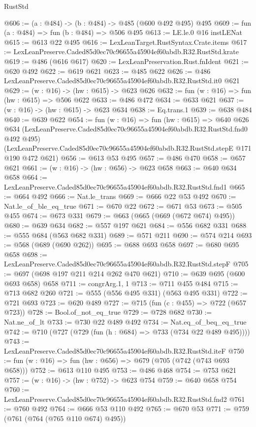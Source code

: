 \begin{lexlean}{RustStd}
\begin{coremodule}
@606 := (a : @484) -> (b : @484) -> @485 (@600 @492 @495) @495
@609 := fun (a : @484) => fun (b : @484) => @506 @495
@613 := LE.le.{0} @16 instLENat
@615 := @613 @22 @495
@616 := LexLeanTarget.RustSyntax.Crate.items
@617 := LexLeanPreserve.Caded85d0ec70c96655a45904ef60abdb.R32.RustStd.krate
@619 := @486 (@616 @617)
@620 := LexLeanPreservation.Rust.fnIdent
@621 := @620 @492
@622 := @619 @621
@623 := @485 @622
@626 := @486 LexLeanPreserve.Caded85d0ec70c96655a45904ef60abdb.R32.RustStd.it0 @621
@629 := (w : @16) -> (hw : @615) -> @623 @626
@632 := fun (w : @16) => fun (hw : @615) => @506 @622
@633 := @486 @472
@634 := @633 @621
@637 := (w : @16) -> (hw : @615) -> @623 @634
@638 := Eq.trans.{1}
@639 := @638 @484
@640 := @639 @622
@654 := fun (w : @16) =>
  fun (hw : @615) =>
  @640
    @626
    @634
    (LexLeanPreserve.Caded85d0ec70c96655a45904ef60abdb.R32.RustStd.fnd0 @492 @495)
    (LexLeanPreserve.Caded85d0ec70c96655a45904ef60abdb.R32.RustStd.stepE @171 @190 @472 @621)
@656 := @613 @53 @495
@657 := @486 @470
@658 := @657 @621
@661 := (w : @16) -> (hw : @656) -> @623 @658
@663 := @640 @634 @658
@664 := LexLeanPreserve.Caded85d0ec70c96655a45904ef60abdb.R32.RustStd.fnd1
@665 := @664 @492
@666 := Nat.le_trans
@669 := @666 @22 @53 @492
@670 := Nat.le_of_ble_eq_true
@671 := @670 @22
@672 := @671 @53
@673 := @505 @455
@674 := @673 @331
@679 := @663 (@665 (@669 (@672 @674) @495))
@680 := @639 @634
@682 := @557 @197 @621
@684 := @556 @682 @331
@688 := @555 @684 (@563 @682 @331)
@689 := @571 @211
@690 := @574 @214
@693 := @568 (@689 (@690 @262))
@695 := @688 @693 @658
@697 := @680 @695 @658
@698 := LexLeanPreserve.Caded85d0ec70c96655a45904ef60abdb.R32.RustStd.stepF
@705 := @697 (@698 @197 @211 @214 @262 @470 @621)
@710 := @639 @695 (@600 @693 @658) @658
@711 := congrArg.{1, 1}
@713 := @711 @455 @484
@715 := @713 @682 @260
@721 := @555 (@556 @495 @331) (@563 @495 @331)
@722 := @721 @693
@723 := @620 @489
@727 := @715 (fun (c : @455) => @722 (@657 @723))
@728 := Bool.of_not_eq_true
@729 := @728 @682
@730 := Nat.ne_of_lt
@733 := @730 @22 @489 @492
@734 := Nat.eq_of_beq_eq_true
@742 := @710 (@727 (@729 (fun (h : @684) => @733 (@734 @22 @489 @495))))
@743 := LexLeanPreserve.Caded85d0ec70c96655a45904ef60abdb.R32.RustStd.iteF
@750 := fun (w : @16) => fun (hw : @656) => @679 (@705 (@742 (@743 @693 @658)))
@752 := @613 @110 @495
@753 := @486 @468
@754 := @753 @621
@757 := (w : @16) -> (hw : @752) -> @623 @754
@759 := @640 @658 @754
@760 := LexLeanPreserve.Caded85d0ec70c96655a45904ef60abdb.R32.RustStd.fnd2
@761 := @760 @492
@764 := @666 @53 @110 @492
@765 := @670 @53
@771 := @759 (@761 (@764 (@765 @110 @674) @495))

\end{coremodule}
\end{lexlean}

